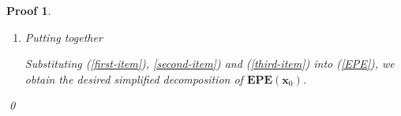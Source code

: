 \documentclass[a4paper,UTF8]{article}
\numberwithin{equation}{section}
\newtheorem*{myProof}{Proof}
\begin{document}
\begin{myProof}
\begin{enumerate}[Step 1.]
\begin{itemize}
Using (\ref{ybar0}) and (\ref{yhat0}), we have
\begin{equation*}
\begin{split}
\mathbb{E}_{y_0|\textbf{x}_0} \mathbb{E}_{\mathcal{D}}[(\bar{y}_0-\hat{y}_0)^2 ]
&= \mathbb{E}_{y_0|\textbf{x}_0} \mathbb{E}_{\mathcal{D}}[(\textbf{x}_0^T \bm{\beta} - \textbf{x}_0^T\bm{\beta} + \textbf{x}_0^T(\textbf{X}\textbf{X}^T)^{-1} \textbf{X} \epsilon)^2] \\
&= \mathbb{E}_{y_0|\textbf{x}_0} \mathbb{E}_{\mathcal{D}}[(\textbf{x}_0^T(\textbf{X}\textbf{X}^T)^{-1} \textbf{X} \epsilon)^2 ]\\
&= \mathbb{E}_{y_0|\textbf{x}_0} \mathbb{E}_{\mathcal{D}}[(\textbf{x}_0^T(\textbf{X}\textbf{X}^T)^{-1} \textbf{X} \epsilon)(\textbf{x}_0^T(\textbf{X}\textbf{X}^T)^{-1} \textbf{X} \epsilon)] \\
&= \mathbb{E}_{y_0|\textbf{x}_0} \mathbb{E}_{\mathcal{D}}[(\textbf{x}_0^T(\textbf{X}\textbf{X}^T)^{-1} \textbf{X}) (\textbf{x}_0^T(\textbf{X}\textbf{X}^T)^{-1} \textbf{X})\epsilon ^2] 
\end{split}
\end{equation*}
Since $\textbf{X}\textbf{X}^T$ is symmetric, which suggests $\textbf{x}_0^T(\textbf{X}\textbf{X}^T)^{-1} \textbf{X}$ is a quadratic form, we have
$$\textbf{x}_0^T(\textbf{X}\textbf{X}^T)^{-1} \textbf{X} = \textbf{X}^T(\textbf{X}\textbf{X}^T)^{-1} \textbf{x}_0$$. Therefore,
\begin{equation}\label{second-item}
\begin{split}
\mathbb{E}_{y_0|\textbf{x}_0} \mathbb{E}_{\mathcal{D}}[(\bar{y}_0-\hat{y}_0)^2 ] 
&= \mathbb{E}_{y_0|\textbf{x}_0} \mathbb{E}_{\mathcal{D}}[(\textbf{x}_0^T(\textbf{X}\textbf{X}^T)^{-1} \textbf{X}) (\textbf{X}^T(\textbf{X}\textbf{X}^T)^{-1} \textbf{x}_0)\epsilon ^2] \\
&= \mathbb{E}_{y_0|\textbf{x}_0} \mathbb{E}_{\mathcal{D}}[\textbf{x}_0^T(\textbf{X}\textbf{X}^T)^{-1} (\textbf{X} \textbf{X}^T) (\textbf{X}\textbf{X}^T)^{-1} \textbf{x}_0 \epsilon ^2]  \\
&= \mathbb{E}_{\mathcal{D}}[\textbf{x}_0^T(\textbf{X}\textbf{X}^T)^{-1} \textbf{x}_0\sigma ^2] 
\end{split}
\end{equation}

\item The third item
Because of the definition of $\hat{y}_0$  (\ref{def_ybar0}), 
 \begin{equation}\label{third-item}
 {E}_{\mathcal{D}}[(y_0-\bar{y}_0)(\bar{y}_0 - \hat{y}_0) = 0.
 \end{equation}
 
\end{itemize}

\item Putting together

Substituting (\ref{first-item}), \ref{second-item}) and (\ref{third-item}) into (\ref{EPE}), we obtain the desired simplified decomposition of $\mathbf{EPE}(\textbf{x}_0)$.
\end{enumerate}
\qed
\end{myProof}
\end{document}
